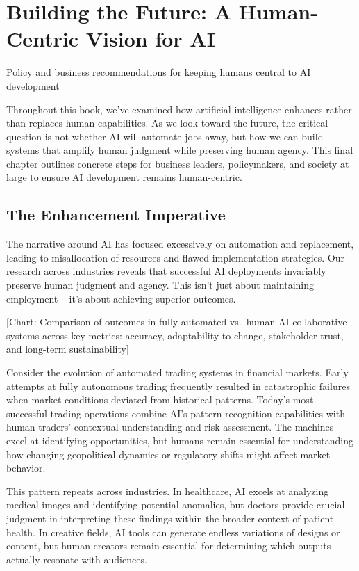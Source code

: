 \documentclass[
  Letterpaper,
]{scrbook}
\begin{document}

\chapter{Building the Future: A Human-Centric Vision for
AI}\label{building-the-future-a-human-centric-vision-for-ai}

Policy and business recommendations for keeping humans central to AI
development

\hfill\break

Throughout this book, we've examined how artificial intelligence
enhances rather than replaces human capabilities. As we look toward the
future, the critical question is not whether AI will automate jobs away,
but how we can build systems that amplify human judgment while
preserving human agency. This final chapter outlines concrete steps for
business leaders, policymakers, and society at large to ensure AI
development remains human-centric.

\section{The Enhancement Imperative}\label{the-enhancement-imperative}

The narrative around AI has focused excessively on automation and
replacement, leading to misallocation of resources and flawed
implementation strategies. Our research across industries reveals that
successful AI deployments invariably preserve human judgment and agency.
This isn't just about maintaining employment -- it's about achieving
superior outcomes.

{[}Chart: Comparison of outcomes in fully automated vs.~human-AI
collaborative systems across key metrics: accuracy, adaptability to
change, stakeholder trust, and long-term sustainability{]}

Consider the evolution of automated trading systems in financial
markets. Early attempts at fully autonomous trading frequently resulted
in catastrophic failures when market conditions deviated from historical
patterns. Today's most successful trading operations combine AI's
pattern recognition capabilities with human traders' contextual
understanding and risk assessment. The machines excel at identifying
opportunities, but humans remain essential for understanding how
changing geopolitical dynamics or regulatory shifts might affect market
behavior.

This pattern repeats across industries. In healthcare, AI excels at
analyzing medical images and identifying potential anomalies, but
doctors provide crucial judgment in interpreting these findings within
the broader context of patient health. In creative fields, AI tools can
generate endless variations of designs or content, but human creators
remain essential for determining which outputs actually resonate with
audiences.
\end{document}
